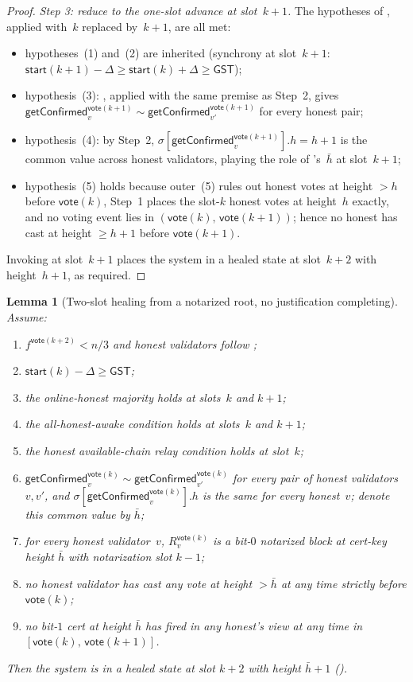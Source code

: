 \ifx\litemode\undefined\documentclass{article}\fi
\newcommand{\start}{\mathsf{start}}
\newcommand{\vote}{\mathsf{vote}}
\newcommand{\comm}[1]{\bar{#1}}
\newcommand{\getConfirmed}{\textsf{getConfirmed}\xspace}
\theoremstyle{plain}
\newtheorem{lemma}{Lemma}
\theoremstyle{definition}
\theoremstyle{remark}
\newcommand{\GST}{\ensuremath{\mathsf{GST}}}
\newcommand{\OHM}{online-honest majority\xspace}
\newcommand{\HAR}{honest available-chain relay\xspace}
\newcommand{\AHA}{all-honest-awake\xspace}
\begin{document}
\begin{proof}
\emph{Step 3: reduce to the one-slot advance at slot~$k+1$.}
The hypotheses of , applied with~$k$ replaced by~$k+1$, are all met:
\begin{itemize}
  \item hypotheses~(1) and~(2) are inherited (synchrony at slot~$k+1$: $\start(k+1) - \Delta \geq \start(k) + \Delta \geq \GST$);
  \item hypothesis~(3): , applied with the same premise as Step~2, gives $\getConfirmed_v^{\vote(k+1)} \sim \getConfirmed_{v'}^{\vote(k+1)}$ for every honest pair;
  \item hypothesis~(4): by Step~2, $\sigma[\getConfirmed_v^{\vote(k+1)}].h = h + 1$ is the common value across honest validators, playing the role of 's~$\comm{h}$ at slot~$k+1$;
  \item hypothesis~(5) holds because outer~(5) rules out honest votes at height $>h$ before $\vote(k)$, Step~1 places the slot-$k$ honest votes at height~$h$ exactly, and no voting event lies in $(\vote(k),\, \vote(k+1))$; hence no honest has cast at height $\geq h+1$ before $\vote(k+1)$.
\end{itemize}
Invoking  at slot~$k+1$ places the system in a healed state at slot~$k+2$ with height~$h+1$, as required.
\end{proof}

\begin{lemma}[Two-slot healing from a notarized root, no justification completing]\label{rev:lem:healing-from-notarized-no-just}
Assume:
\begin{enumerate}
  \item $f^{\vote(k+2)} < n/3$ and honest validators follow ;
  \item $\start(k) - \Delta \geq \GST$;
  \item the \OHM holds at slots~$k$ and $k+1$;
  \item the \AHA condition holds at slots~$k$ and $k+1$;
  \item the \HAR condition holds at slot~$k$;
  \item $\getConfirmed_v^{\vote(k)} \sim \getConfirmed_{v'}^{\vote(k)}$ for every pair of honest validators~$v, v'$, and $\sigma[\getConfirmed_v^{\vote(k)}].h$ is the same for every honest~$v$; denote this common value by $\comm{h}$;
  \item for every honest validator~$v$, $R_v^{\vote(k)}$ is a bit-$0$ notarized block at cert-key height $\comm{h}$ with notarization slot $k-1$;
  \item no honest validator has cast any vote at height $> \comm{h}$ at any time strictly before $\vote(k)$;
  \item no bit-$1$ cert at height $\comm{h}$ has fired in any honest's view at any time in $[\vote(k),\, \vote(k+1)]$.
\end{enumerate}
Then the system is in a healed state at slot $k+2$ with height $\comm{h}+1$ ().
\end{lemma}
\end{document}
